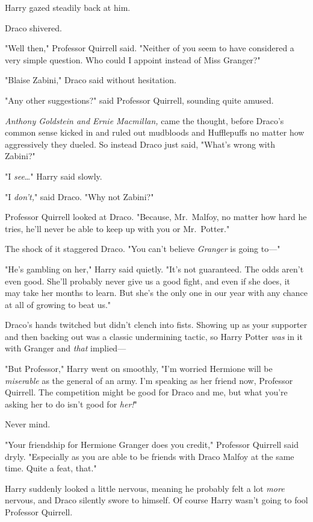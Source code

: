 Harry gazed steadily back at him.

Draco shivered.

"Well then," Professor Quirrell said. "Neither of you seem to have considered a 
very simple question. Who could I appoint instead of Miss Granger?"

"Blaise Zabini," Draco said without hesitation.

"Any other suggestions?" said Professor Quirrell, sounding quite amused.

\emph{Anthony Goldstein and Ernie Macmillan,} came the thought, before Draco's 
common sense kicked in and ruled out mudbloods and Hufflepuffs no matter how 
aggressively they dueled. So instead Draco just said, "What's wrong with 
Zabini?"

"I \emph{see}{\ldots}" Harry said slowly.

"I \emph{don't,}" said Draco. "Why not Zabini?"

Professor Quirrell looked at Draco. "Because, Mr.~Malfoy, no matter how hard he 
tries, he'll never be able to keep up with you or Mr.~Potter."

The shock of it staggered Draco. "You can't believe \emph{Granger} is going 
to---"

"He's gambling on her," Harry said quietly. "It's not guaranteed. The odds 
aren't even good. She'll probably never give us a good fight, and even if she 
does, it may take her months to learn. But she's the only one in our year with 
any chance at all of growing to beat us."

Draco's hands twitched but didn't clench into fists. Showing up as your 
supporter and then backing out was a classic undermining tactic, so Harry 
Potter \emph{was} in it with Granger and \emph{that} implied---

"But Professor," Harry went on smoothly, "I'm worried Hermione will be 
\emph{miserable} as the general of an army. I'm speaking as her friend now, 
Professor Quirrell. The competition might be good for Draco and me, but what 
you're asking her to do isn't good for \emph{her!}"

Never mind.

"Your friendship for Hermione Granger does you credit," Professor Quirrell said 
dryly. "Especially as you are able to be friends with Draco Malfoy at the same 
time. Quite a feat, that."

Harry suddenly looked a little nervous, meaning he probably felt a lot 
\emph{more} nervous, and Draco silently swore to himself. Of course Harry 
wasn't going to fool Professor Quirrell.

